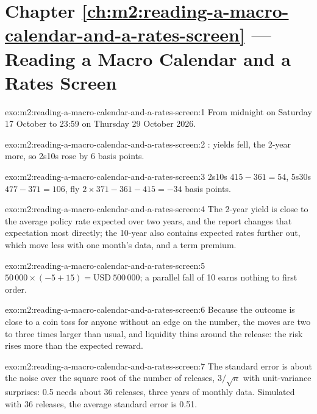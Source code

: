 \section*{Chapter \ref{ch:m2:reading-a-macro-calendar-and-a-rates-screen} --- Reading a Macro Calendar and a Rates Screen}

\begin{solution}{exo:m2:reading-a-macro-calendar-and-a-rates-screen:1}
From midnight on Saturday 17 October to 23:59 on Thursday 29 October 2026.
\end{solution}

\begin{solution}{exo:m2:reading-a-macro-calendar-and-a-rates-screen:2}
: yields fell, the 2-year more, so 2s10s rose by 6 basis points.
\end{solution}

\begin{solution}{exo:m2:reading-a-macro-calendar-and-a-rates-screen:3}
2s10s $415 - 361 = 54$, 5s30s $477 - 371 = 106$, fly $2 \times 371 - 361 - 415 = -34$ basis
points.
\end{solution}

\begin{solution}{exo:m2:reading-a-macro-calendar-and-a-rates-screen:4}
The 2-year yield is close to the average policy rate expected over two years, and the
report changes that expectation most directly; the 10-year also contains expected rates
further out, which move less with one month's data, and a term premium.
\end{solution}

\begin{solution}{exo:m2:reading-a-macro-calendar-and-a-rates-screen:5}
$50\,000 \times (-5 + 15) = \text{USD}~500\,000$; a parallel fall of 10 earns nothing to
first order.
\end{solution}

\begin{solution}{exo:m2:reading-a-macro-calendar-and-a-rates-screen:6}
Because the outcome is close to a coin toss for anyone without an edge on the number, the
moves are two to three times larger than usual, and liquidity thins around the release:
the risk rises more than the expected reward.
\end{solution}

\begin{solution}{exo:m2:reading-a-macro-calendar-and-a-rates-screen:7}
The standard error is about the noise over the square root of the number of releases,
$3/\sqrt n$ with unit-variance surprises: 0.5 needs about 36 releases, three years of monthly
data. Simulated with 36 releases, the average standard error is 0.51.
\end{solution}

